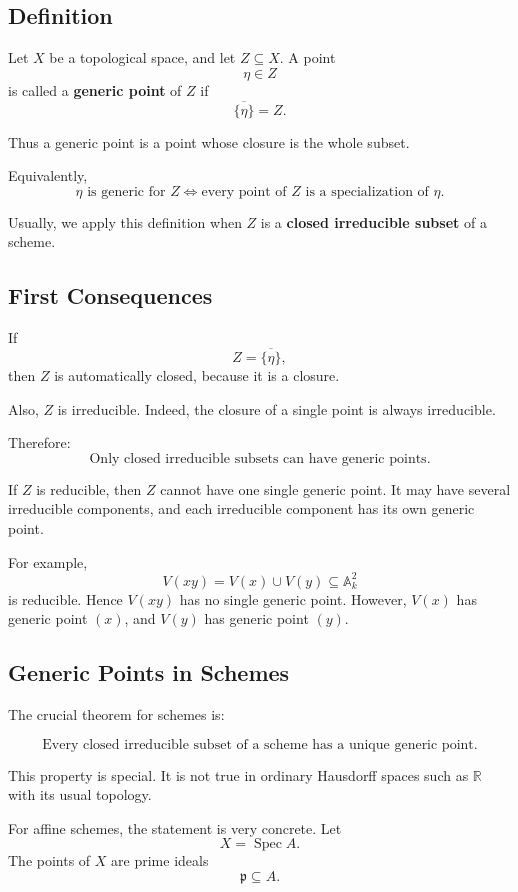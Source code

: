 \documentclass[12pt,a4paper]{article}
\theoremstyle{notespace}
\begin{document}
\subsection{Definition}

Let \(X\) be a topological space, and let \(Z\subseteq X\). A point
\[
\eta\in Z
\]
is called a \textbf{generic point} of \(Z\) if
\[
\overline{\{\eta\}}=Z.
\]

Thus a generic point is a point whose closure is the whole subset.

Equivalently,
\[
\boxed{
	\eta \text{ is generic for } Z
	\iff
	\text{every point of }Z\text{ is a specialization of }\eta.
}
\]

Usually, we apply this definition when \(Z\) is a \textbf{closed irreducible subset} of a scheme.

\subsection{First Consequences}

If
\[
Z=\overline{\{\eta\}},
\]
then \(Z\) is automatically closed, because it is a closure.

Also, \(Z\) is irreducible. Indeed, the closure of a single point is always irreducible.

Therefore:
\[
\boxed{
	\text{Only closed irreducible subsets can have generic points.}
}
\]

If \(Z\) is reducible, then \(Z\) cannot have one single generic point. It may have several irreducible components, and each irreducible component has its own generic point.

For example,
\[
V(xy)=V(x)\cup V(y)\subseteq \mathbb A^2_k
\]
is reducible. Hence \(V(xy)\) has no single generic point. However, \(V(x)\) has generic point \((x)\), and \(V(y)\) has generic point \((y)\).

\subsection{Generic Points in Schemes}

The crucial theorem for schemes is:

\[
\boxed{
	\text{Every closed irreducible subset of a scheme has a unique generic point.}
}
\]

This property is special. It is not true in ordinary Hausdorff spaces such as \(\mathbb R\) with its usual topology.

For affine schemes, the statement is very concrete. Let
\[
X=\operatorname{Spec} A.
\]
The points of \(X\) are prime ideals
\[
\mathfrak p\subseteq A.
\]
\end{document}
